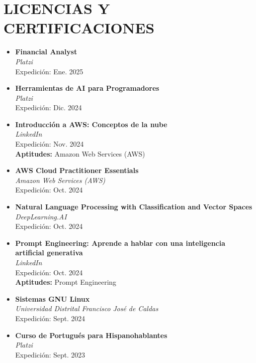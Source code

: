 \documentclass[paper=a4,fontsize=11pt]{scrartcl} %
\newcommand{\sepspace}{\vspace*{0.8em}}
\newcommand{\NewPart}[1]{\section*{\uppercase{#1}}}
\begin{document}
\sepspace

\NewPart{Licencias y Certificaciones}
\begin{itemize}[leftmargin=*, noitemsep]
  \item \textbf{Financial Analyst} \\
        \textit{Platzi} \\
        Expedición: Ene. 2025 

  \item \textbf{Herramientas de AI para Programadores} \\
        \textit{Platzi} \\
        Expedición: Dic. 2024 

  \item \textbf{Introducción a AWS: Conceptos de la nube} \\
        \textit{LinkedIn} \\
        Expedición: Nov. 2024 \\
        \textbf{Aptitudes:} Amazon Web Services (AWS) 

  \item \textbf{AWS Cloud Practitioner Essentials} \\
        \textit{Amazon Web Services (AWS)} \\
        Expedición: Oct. 2024 

  \item \textbf{Natural Language Processing with Classification and Vector Spaces} \\
        \textit{DeepLearning.AI} \\
        Expedición: Oct. 2024 

  \item \textbf{Prompt Engineering: Aprende a hablar con una inteligencia artificial generativa} \\
        \textit{LinkedIn} \\
        Expedición: Oct. 2024 \\
        \textbf{Aptitudes:} Prompt Engineering 

  \item \textbf{Sistemas GNU Linux} \\
        \textit{Universidad Distrital Francisco José de Caldas} \\
        Expedición: Sept. 2024 

  \item \textbf{Curso de Portugués para Hispanohablantes} \\
        \textit{Platzi} \\
        Expedición: Sept. 2023 


\end{itemize}
\end{document}
